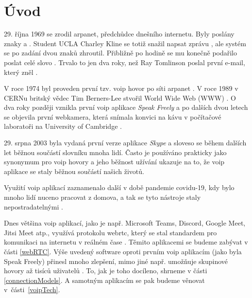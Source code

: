 \section{Úvod}

29. října 1969 se zrodil \gls{arpanet}, předchůdce dnešního internetu. Byly
poslány znaky  a . Student UCLA Charley Kline se totiž snažil napsat
zprávu , ale systém se po zadání dvou znaků zhroutil. Přibližně po
hodině se mu konečně podařilo poslat celé slovo
\parencite{PBS-SimpleHelloFirstMessageOverARPANET}. Trvalo to jen dva roky, než
Ray Tomlinson poslal první e-mail, který zněl 
\parencite{YahooFinance-SimpleHelloFirstMessageOverARPANET}.

V roce 1974 byl proveden první tzv. \gls{voip} hovor po síti \gls{arpanet}
\parencite{DigiFone-WhatYouMightNotKnowAboutTheHistoryOfVoIP}. V roce 1989 v
CERNu britský vědec Tim Berners-Lee stvořil World Wide Web (WWW)
\parencite{CERN-TheBirthOfTheWeb}. O dva roky později vznikla první \gls{voip}
aplikace \textit{Speak Freely}
\parencite{DigiFone-WhatYouMightNotKnowAboutTheHistoryOfVoIP} a po dalších dvou
letech se objevila první webkamera, která snímala konvici na kávu v počítačové
laboratoři na University of Cambridge
\parencite{BBC-FirstWebcamMadeCoffeePotFamous}.

29. srpna 2003 byla vydaná první verze aplikace \textit{Skype}
\parencite{ArsTechnica-TheStrangeStoryOfSkype} a sloveso  se
během dalších let běžnou součástí slovníku mnoha lidí. Často je používáno
prakticky jako synonymum pro \gls{voip} hovory a jeho běžnost užívání ukazuje na
to, že \gls{voip} aplikace se staly běžnou součástí našich životů.

Využití \gls{voip} aplikací zaznamenalo další  v době pandemie
covidu-19, kdy bylo mnoho lidí nuceno pracovat z domova, a tak se tyto nástroje
staly nepostradatelnými \parencite{OnSIP-VoIPStatsTrendsCovidImpact}.

Dnes většina \gls{voip} aplikací, jako je např. Microsoft Teams, Discord, Google
Meet, Jitsi Meet atp., využívá protokolu \gls{webrtc}, který se stal standardem
pro komunikaci na internetu v reálném čase
\parencite{LevelUp-WhatPowerMeetAndTeams,
    Discord-HowDoesItHandleMillionsOfUsers, Jitsi-Projects, WebRTCORG-Homepage}.
Těmito aplikacemi se budeme zabývat v části \ref{webRTC}. Výše uvedený software
oproti prvním \gls{voip} aplikacím (jako byla Speak Freely) přinesl mnoho
zlepšení, mimo jiné např. umožňuje skupinové hovory až tisíců uživatelů
\parencite{MicrosoftLearn-MSTeamsLimitsAndSpecs}. To, jak je toho docíleno,
shrneme v části \ref{connectionModels}. A samotným aplikacím se pak budeme
věnovat v~části~\ref{voipTech}.

